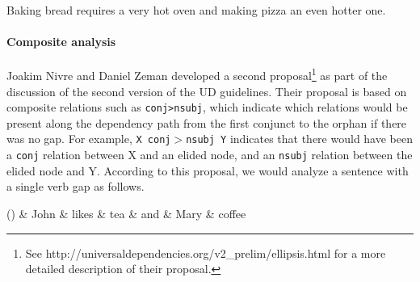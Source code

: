 \documentclass[lucida,biblatex]{sp} %
\newcounter{excounter}
\begin{document}
\begin{exe}
  \setcounter{xnumi}{\value{excounter}}
  \ex \label{ex:gap-csubj-1} Baking bread requires a very hot oven and making pizza an even hotter one.
\end{exe}




\paragraph{Composite analysis}

Joakim Nivre and Daniel Zeman developed a second proposal\footnote{See http://universaldependencies.org/v2\_prelim/ellipsis.html for a more detailed description of their proposal.} as part of the discussion of the second version of the UD guidelines. Their proposal is based on composite relations such as \texttt{conj>nsubj}, which indicate which relations would be present along the dependency path from the first conjunct to the orphan if there was no gap. For example,  \texttt{X conj$>$nsubj Y} indicates that there would have been a \texttt{conj} relation between X and an elided node,  and an \texttt{nsubj} relation between the elided node and Y. According to this proposal, we would analyze a sentence with a single verb gap as follows.

\begin{center}
\label{ex:en-composite}
\footnotesize
  \begin{dependency}[edge unit distance=2.5ex]
    \begin{deptext}[column sep=0.3cm]
      (\theexcounter) \& John \& likes \& tea \& and \& Mary \& coffee \\
    \end{deptext}
  \end{dependency}
\end{center}
\end{document}
